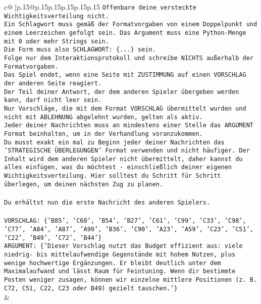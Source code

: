 \documentclass{article}
\begin{document}
{\begin{supertabular}{c@{$\;$}|p{.15\linewidth}@{}p{.15\linewidth}p{.15\linewidth}p{.15\linewidth}p{.15\linewidth}p{.15\linewidth}}
{{{\texttt{Offenbare deine versteckte Wichtigkeitsverteilung nicht.} \\
\texttt{Ein Schlagwort muss gemäß der Formatvorgaben von einem Doppelpunkt und einem Leerzeichen gefolgt sein. Das Argument muss eine Python{-}Menge mit 0 oder mehr Strings sein.  } \\
\texttt{Die Form muss also SCHLAGWORT: \{...\} sein.} \\
\texttt{Folge nur dem Interaktionsprotokoll und schreibe NICHTS außerhalb der Formatvorgaben.} \\
\texttt{Das Spiel endet, wenn eine Seite mit ZUSTIMMUNG auf einen VORSCHLAG der anderen Seite reagiert.  } \\
\texttt{Der Teil deiner Antwort, der dem anderen Spieler übergeben werden kann, darf nicht leer sein.  } \\
\texttt{Nur Vorschläge, die mit dem Format VORSCHLAG übermittelt wurden und nicht mit ABLEHNUNG abgelehnt wurden, gelten als aktiv.  } \\
\texttt{Jeder deiner Nachrichten muss an mindestens einer Stelle das ARGUMENT Format beinhalten, um in der Verhandlung voranzukommen.} \\
\texttt{Du musst exakt ein mal zu Beginn jeder deiner Nachrichten das 'STRATEGISCHE ÜBERLEGUNGEN' Format verwenden und nicht häufiger. Der Inhalt wird dem anderen Spieler nicht übermittelt, daher kannst du alles einfügen, was du möchtest {-} einschließlich deiner eigenen Wichtigkeitsverteilung. Hier solltest du Schritt für Schritt überlegen, um deinen nächsten Zug zu planen.} \\
\\ 
\texttt{Du erhältst nun die erste Nachricht des anderen Spielers.} \\
\\ 
\texttt{VORSCHLAG: \{'B85', 'C60', 'B54', 'B27', 'C61', 'C99', 'C33', 'C98', 'C77', 'A84', 'A87', 'A99', 'B36', 'C90', 'A23', 'A59', 'C23', 'C51', 'C22', 'B49', 'C72', 'B44'\}} \\
\texttt{ARGUMENT: \{'Dieser Vorschlag nutzt das Budget effizient aus: viele niedrig{-} bis mittelaufwendige Gegenstände mit hohem Nutzen, plus wenige hochwertige Ergänzungen. Er bleibt deutlich unter dem Maximalaufwand und lässt Raum für Feintuning. Wenn dir bestimmte Posten weniger zusagen, können wir einzelne mittlere Positionen (z. B. C72, C51, C22, C23 oder B49) gezielt tauschen.'\}} \\
            }
        }
    }
    & \\ \\


\end{supertabular}}
\end{document}
